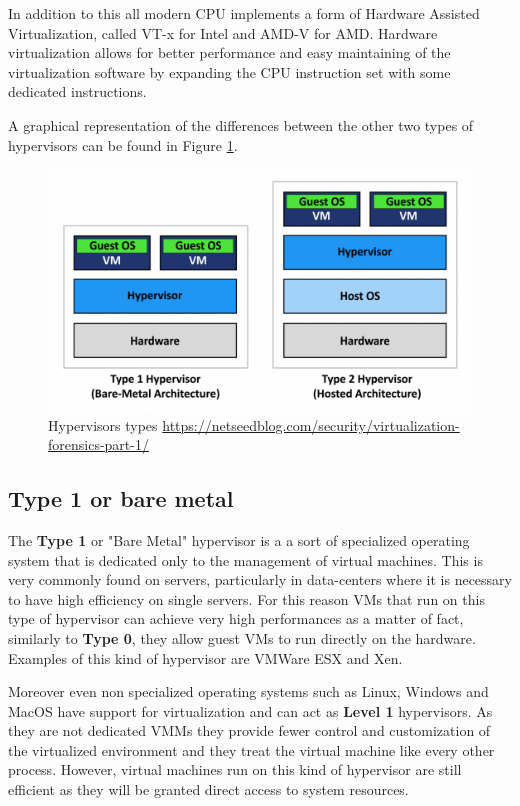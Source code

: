 In addition to this all modern CPU implements a form of Hardware Assisted Virtualization, called VT-x for Intel and AMD-V for AMD. Hardware virtualization allows for better performance and easy maintaining of the virtualization software by expanding the CPU instruction set with some dedicated instructions. 

A graphical representation of the differences between the other two types of hypervisors can be found in Figure \ref{fig:hip}.

\begin{figure}[htp]
\centering
\includegraphics[width=\linewidth]{images/hip.png}
\caption{Hypervisors types \newline \url{https://netseedblog.com/security/virtualization-forensics-part-1/}}
\label{fig:hip}
\end{figure}



\subsection{Type 1 or bare metal}

The \textbf{Type 1} or "Bare Metal" hypervisor is a a sort of specialized operating system that is dedicated only to the management of virtual machines. This is very commonly found on servers, particularly in data-centers where it is necessary to have high efficiency on single servers. For this reason VMs that run on this type of hypervisor can achieve very high performances as a matter of fact, similarly to \textbf{Type 0}, they allow guest VMs to run directly on the hardware. Examples of this kind of hypervisor are VMWare ESX and Xen.

Moreover even non specialized operating systems such as Linux, Windows and MacOS have support for virtualization and can act as \textbf{Level 1} hypervisors. As they are not dedicated VMMs they provide fewer control and customization of the virtualized environment and they treat the virtual machine like every other process. However, virtual machines run on this kind of hypervisor are still efficient as they will be granted direct access to system resources. 

